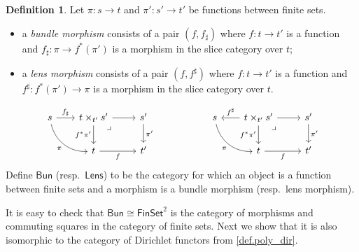 \documentclass[11pt, article, one side]{memoir}
\theoremstyle{theorem}
\theoremstyle{definition}
\newtheorem{definition}[equation]{Definition}
\theoremstyle{remark}
\newcommand{\Cat}[1]{\mathsf{#1}}%
\newcommand{\finset}{\Cat{FinSet}}
\newcommand{\lens}{\Cat{Lens}}
\newcommand{\bun}{\Cat{Bun}}
\begin{document}
\begin{definition}\label{def.sheaves_bundles}
Let $\pi\colon s\to t$ and $\pi'\colon s'\to t'$ be functions between finite sets.
\begin{itemize}
	\item a \emph{bundle morphism} consists of a pair $(f,f_\sharp)$ where $f\colon t\to t'$ is a function and $f_\sharp\colon \pi\to f^*(\pi')$ is a morphism in the slice category over $t$;
	\item a \emph{lens morphism} consists of a pair $(f,f^\sharp)$ where $f\colon t\to t'$ is a function and $f^\sharp\colon f^*(\pi')\to \pi$ is a morphism in the slice category over $t$.
\end{itemize}
\[
\begin{tikzcd}
s\ar[dr, bend right=40pt, "\pi"']&[-5pt]
t\times_{t'}s'\ar[r]\ar[d, "f^*\pi'"']\ar[from=l, "f_\sharp"]&
s'\ar[d, "\pi'"]\\&
t\ar[r, "f"']&
t'\ar[ul, phantom, very near end, "\lrcorner"]
\end{tikzcd}
\hspace{.75in}
\begin{tikzcd}
s\ar[dr, bend right=40pt, "\pi"']&[-5pt]
t\times_{t'}s'\ar[r]\ar[d, "f^*\pi'"']\ar[l, "f^\sharp"']&
s'\ar[d, "\pi'"]\\&
t\ar[r, "f"']&
t'\ar[ul, phantom, very near end, "\lrcorner"]
\end{tikzcd}
\]
Define $\bun$ (resp.\ $\lens$) to be the category for which an object is a function between finite sets and a morphism is a bundle morphism (resp.\ lens morphism).
\end{definition}

It is easy to check that $\bun\cong\finset^2$ is the category of morphisms and commuting squares in the category of finite sets. Next we show that it is also isomorphic to the category of Dirichlet functors from \cref{def.poly_dir}.
\end{document}
